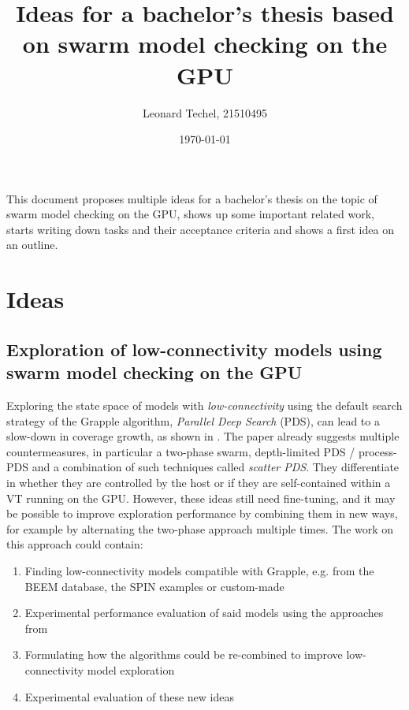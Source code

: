 \documentclass[a4paper]{scrartcl}
\title{Ideas for a bachelor's thesis based on swarm model checking on the GPU}
\author{Leonard Techel, 21510495}
\date{\today}
\begin{document}
\maketitle

This document proposes multiple ideas for a bachelor's thesis on the topic of swarm model checking on the GPU, shows up some important related work, starts writing down tasks and their acceptance criteria and shows a first idea on an outline.

\section{Ideas}


\subsection{Exploration of low-connectivity models using swarm model checking on the GPU}

Exploring the state space of models with \emph{low-connectivity} using the default search strategy of the Grapple algorithm, \emph{Parallel Deep Search} (PDS), can lead to a slow-down in coverage growth, as shown in \cite{DeFrancisco2020.Grapple}.
The paper already suggests multiple countermeasures, in particular a two-phase swarm, depth-limited PDS / process-PDS and a combination of such techniques called \emph{scatter PDS}.
They differentiate in whether they are controlled by the host or if they are self-contained within a VT running on the GPU.
However, these ideas still need fine-tuning, and it may be possible to improve exploration performance by combining them in new ways, for example by alternating the two-phase approach multiple times.
The work on this approach could contain:

\begin{enumerate}
    \item Finding low-connectivity models compatible with Grapple, e.g. from the BEEM database, the SPIN examples or custom-made
    \item Experimental performance evaluation of said models using the approaches from \cite{DeFrancisco2020.Grapple}
    \item Formulating how the algorithms could be re-combined to improve low-connectivity model exploration
    \item Experimental evaluation of these new ideas
\end{enumerate}
\end{document}
